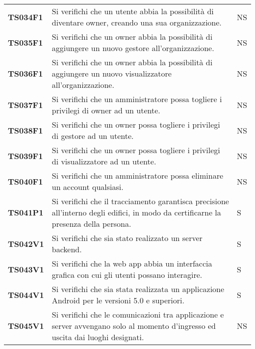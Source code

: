 \documentclass[../../piano-di-qualifica.tex]{subfiles}
\begin{document}
\begin{longtable}[H]{>{\centering\bfseries}m{3cm} >{}m{10cm} >{\centering\arraybackslash}m{3cm}}
  TS034F1            & Si verifichi che un utente abbia la possibilità di diventare owner, creando una sua organizzazione.
  & NS               \\

  TS035F1            & Si verifichi che un owner abbia la possibilità di aggiungere un nuovo gestore all'organizzazione.
  & NS               \\

  TS036F1            & Si verifichi che un owner abbia la possibilità di aggiungere un nuovo visualizzatore all'organizzazione.
  & NS               \\

  TS037F1            & Si verifichi che un amministratore possa togliere i privilegi di owner ad un utente.
  & NS              \\

  TS038F1            & Si verifichi che un owner possa togliere i privilegi di gestore ad un utente.
  & NS               \\

  TS039F1            & Si verifichi che un owner possa togliere i privilegi di visualizzatore ad un utente.
  & NS               \\

  TS040F1            & Si verifichi che un amministratore possa eliminare un account qualsiasi.
  & NS               \\


  TS041P1            & Si verifichi che il tracciamento garantisca precisione all’interno degli edifici, in modo da certificarne la presenza della persona.
                     & S               \\

  TS042V1            & Si verifichi che sia stato realizzato un server backend.
                     & S               \\

  TS043V1            & Si verifichi che la web app abbia un interfaccia grafica con cui gli utenti possano interagire.
                     & S               \\

  TS044V1            & Si verifichi che sia stata realizzata un applicazione Android per le versioni 5.0 e superiori.
                     & S               \\

  TS045V1            & Si verifichi che le comunicazioni tra applicazione e server avvengano solo al momento d'ingresso ed uscita dai luoghi designati.
                     & NS                                                                                                                                                                                                                                                             \\


\end{longtable}
\end{document}
